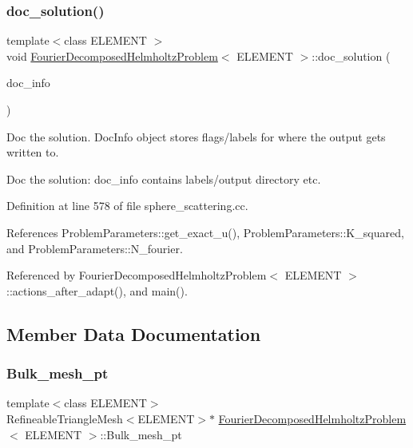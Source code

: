 \subsubsection{\texorpdfstring{doc\+\_\+solution()}{doc\_solution()}\hspace{0.1cm}{\footnotesize\ttfamily [2/2]}}
{\footnotesize\ttfamily template$<$class E\+L\+E\+M\+E\+NT $>$ \\
void \hyperlink{classFourierDecomposedHelmholtzProblem}{Fourier\+Decomposed\+Helmholtz\+Problem}$<$ E\+L\+E\+M\+E\+NT $>$\+::doc\+\_\+solution (\begin{DoxyParamCaption}\item[{Doc\+Info \&}]{doc\+\_\+info }\end{DoxyParamCaption})}



Doc the solution. Doc\+Info object stores flags/labels for where the output gets written to. 

Doc the solution\+: doc\+\_\+info contains labels/output directory etc. 

Definition at line 578 of file sphere\+\_\+scattering.\+cc.



References Problem\+Parameters\+::get\+\_\+exact\+\_\+u(), Problem\+Parameters\+::\+K\+\_\+squared, and Problem\+Parameters\+::\+N\+\_\+fourier.



Referenced by Fourier\+Decomposed\+Helmholtz\+Problem$<$ E\+L\+E\+M\+E\+N\+T $>$\+::actions\+\_\+after\+\_\+adapt(), and main().



\subsection{Member Data Documentation}
\mbox{\label{classFourierDecomposedHelmholtzProblem_a48a453a291906bbc152c21e2151bcb0c}} 
\subsubsection{\texorpdfstring{Bulk\+\_\+mesh\+\_\+pt}{Bulk\_mesh\_pt}\hspace{0.1cm}{\footnotesize\ttfamily [1/3]}}
{\footnotesize\ttfamily template$<$class E\+L\+E\+M\+E\+NT$>$ \\
Refineable\+Triangle\+Mesh$<$E\+L\+E\+M\+E\+NT$>$$\ast$ \hyperlink{classFourierDecomposedHelmholtzProblem}{Fourier\+Decomposed\+Helmholtz\+Problem}$<$ E\+L\+E\+M\+E\+NT $>$\+::Bulk\+\_\+mesh\+\_\+pt\hspace{0.3cm}{\ttfamily [private]}}



